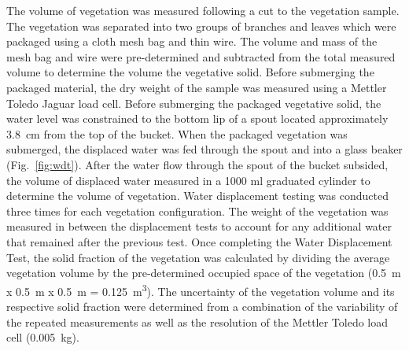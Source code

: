 \documentclass[12pt]{article}
\begin{document}
The volume of vegetation was measured following a cut to the vegetation sample. The vegetation was separated into two groups of branches and leaves which were packaged using a cloth mesh bag and thin wire. The volume and mass of the mesh bag and wire were pre-determined and subtracted from the total measured volume to determine the volume the vegetative solid. Before submerging the packaged material, the dry weight of the sample was measured using a Mettler Toledo Jaguar load cell. Before submerging the packaged vegetative solid, the water level was constrained to the bottom lip of a spout located approximately 3.8~\si{cm} from the top of the bucket. When the packaged vegetation was submerged, the displaced water was fed through the spout and into a glass beaker (Fig.~\ref{fig:wdt}). After the water flow through the spout of the bucket subsided, the volume of displaced water measured in a 1000 ml graduated cylinder to determine the volume of vegetation. Water displacement testing was conducted three times for each vegetation configuration. The weight of the vegetation was measured in between the displacement tests to account for any additional water that remained after the previous test. Once completing the Water Displacement Test, the solid fraction of the vegetation was calculated by dividing the average vegetation volume by the pre-determined occupied space of the vegetation (0.5~\si{m} x 0.5~\si{m} x 0.5~\si{m} = 0.125~\si{m^{3}}). The uncertainty of the vegetation volume and its respective solid fraction were determined from a combination of the variability of the repeated measurements as well as the resolution of the Mettler Toledo load cell (0.005~\si{kg}).
\end{document}
